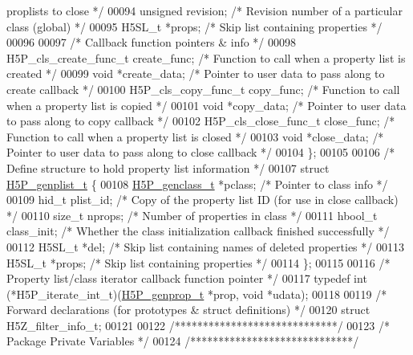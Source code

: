\begin{DoxyCode}
{       proplists to close */}
00094     \textcolor{keywordtype}{unsigned}   revision;   \textcolor{comment}{/* Revision number of a particular class (global) */}
00095     H5SL\_t    *props;      \textcolor{comment}{/* Skip list containing properties */}
00096 
00097     \textcolor{comment}{/* Callback function pointers & info */}
00098     H5P\_cls\_create\_func\_t create\_func;  \textcolor{comment}{/* Function to call when a property list is created */}
00099     \textcolor{keywordtype}{void} *create\_data;     \textcolor{comment}{/* Pointer to user data to pass along to create callback */}
00100     H5P\_cls\_copy\_func\_t copy\_func;      \textcolor{comment}{/* Function to call when a property list is copied */}
00101     \textcolor{keywordtype}{void} *copy\_data;       \textcolor{comment}{/* Pointer to user data to pass along to copy callback */}
00102     H5P\_cls\_close\_func\_t close\_func;    \textcolor{comment}{/* Function to call when a property list is closed */}
00103     \textcolor{keywordtype}{void} *close\_data;      \textcolor{comment}{/* Pointer to user data to pass along to close callback */}
00104 \};
00105 
00106 \textcolor{comment}{/* Define structure to hold property list information */}
00107 \textcolor{keyword}{struct }\hyperlink{struct_h5_p__genplist__t}{H5P\_genplist\_t} \{
00108     \hyperlink{struct_h5_p__genclass__t}{H5P\_genclass\_t} *pclass; \textcolor{comment}{/* Pointer to class info */}
00109     hid\_t   plist\_id;   \textcolor{comment}{/* Copy of the property list ID (for use in close callback) */}
00110     \textcolor{keywordtype}{size\_t}  nprops;     \textcolor{comment}{/* Number of properties in class */}
00111     hbool\_t class\_init; \textcolor{comment}{/* Whether the class initialization callback finished successfully */}
00112     H5SL\_t *del;        \textcolor{comment}{/* Skip list containing names of deleted properties */}
00113     H5SL\_t *props;      \textcolor{comment}{/* Skip list containing properties */}
00114 \};
00115 
00116 \textcolor{comment}{/* Property list/class iterator callback function pointer */}
00117 \textcolor{keyword}{typedef} int (*H5P\_iterate\_int\_t)(\hyperlink{struct_h5_p__genprop__t}{H5P\_genprop\_t} *prop, \textcolor{keywordtype}{void} *udata);
00118 
00119 \textcolor{comment}{/* Forward declarations (for prototypes & struct definitions) */}
00120 \textcolor{keyword}{struct }H5Z\_filter\_info\_t;
00121 
00122 \textcolor{comment}{/*****************************/}
00123 \textcolor{comment}{/* Package Private Variables */}
00124 \textcolor{comment}{/*****************************/}

\end{DoxyCode}
